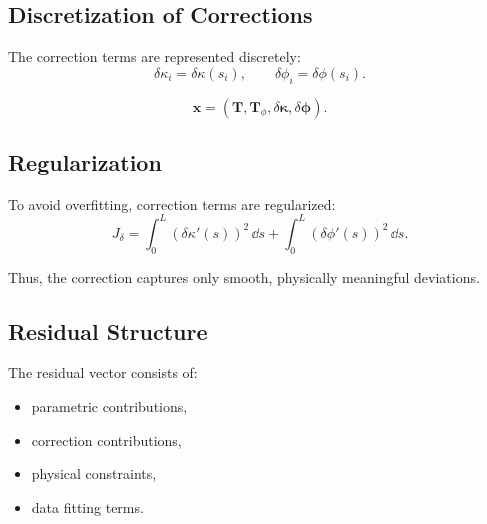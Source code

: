 \subsection{Discretization of Corrections}

\begin{remark}
The correction terms are represented discretely:
\[
\delta\kappa_i = \delta\kappa(s_i),
\qquad
\delta\phi_i = \delta\phi(s_i).
\]
\end{remark}

\begin{definition}
\[
\mathbf{x}
=
(\mathbf{T}, \mathbf{T}_\phi, \delta\boldsymbol{\kappa}, \delta\boldsymbol{\phi}).
\]
\end{definition}

\subsection{Regularization}

\begin{remark}
To avoid overfitting, correction terms are regularized:
\[
J_{\delta}
=
\int_0^L (\delta\kappa'(s))^2 \,\dd s
+
\int_0^L (\delta\phi'(s))^2 \,\dd s.
\]
\end{remark}

\begin{remark}
Thus, the correction captures only smooth, physically meaningful
deviations.
\end{remark}

\subsection{Residual Structure}

\begin{remark}
The residual vector consists of:
\begin{itemize}
\item parametric contributions,
\item correction contributions,
\item physical constraints,
\item data fitting terms.
\end{itemize}
\end{remark}

